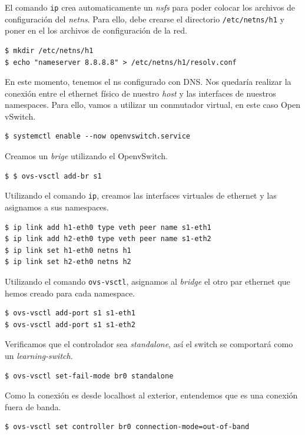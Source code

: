 \documentclass[12pt]{article}
\begin{document}
	\noindent El comando \texttt{ip} crea automaticamente un \textit{nsfs} para poder colocar los archivos de configuración del \textit{netns}. Para ello, debe crearse el directorio \texttt{/etc/netns/h1} y poner en el los archivos de configuración de la red.
	\begin{verbatim}
$ mkdir /etc/netns/h1
$ echo "nameserver 8.8.8.8" > /etc/netns/h1/resolv.conf
	\end{verbatim}

	\noindent En este momento, tenemos el ns configurado con DNS. Nos quedaría realizar la conexión entre el ethernet físico de nuestro \textit{host} y las interfaces de nuestros namespaces. Para ello, vamos a utilizar un conmutador virtual, en este caso Open vSwitch.
	\begin{verbatim}
$ systemctl enable --now openvswitch.service
	\end{verbatim}

	\noindent Creamos un \textit{brige} utilizando el OpenvSwitch.
	\begin{verbatim}
$ $ ovs-vsctl add-br s1
	\end{verbatim}

	\noindent Utilizando el comando \texttt{ip}, creamos las interfaces virtuales de ethernet y las asignamos a sus namespaces.
	\begin{verbatim}
$ ip link add h1-eth0 type veth peer name s1-eth1
$ ip link add h2-eth0 type veth peer name s1-eth2
$ ip link set h1-eth0 netns h1
$ ip link set h2-eth0 netns h2
	\end{verbatim}

	\pagebreak
	
	\noindent Utilizando el comando \texttt{ovs-vsctl}, asignamos al \textit{bridge} el otro par ethernet que hemos creado para cada namespace.
	\begin{verbatim}
$ ovs-vsctl add-port s1 s1-eth1
$ ovs-vsctl add-port s1 s1-eth2
	\end{verbatim}

	\noindent Verificamos que el controlador sea \textit{standalone}, así el switch se comportará como un \textit{learning-switch}.
	\begin{verbatim}
$ ovs-vsctl set-fail-mode br0 standalone
	\end{verbatim}

	\noindent Como la conexión es desde localhost al exterior, entendemos que es una conexión fuera de banda.
	\begin{verbatim}
$ ovs-vsctl set controller br0 connection-mode=out-of-band
	\end{verbatim}
\end{document}
